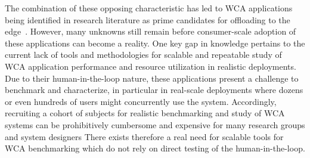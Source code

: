The combination of these opposing characteristic has led to \ac{WCA} applications being identified in research literature as prime candidates for offloading to the edge~\cite{Ha2014towards,Chen2017Empirical,Chen2018application}.
However, many unknowns still remain before consumer-scale adoption of these applications can become a reality.
One key gap in knowledge pertains to the current lack of tools and methodologies for scalable and repeatable study of \ac{WCA} application performance and resource utilization in realistic deployments.
Due to their human-in-the-loop nature, these applications present a challenge to benchmark and characterize, in particular in real-scale deployments where dozens or even hundreds of users might concurrently use the system.
Accordingly, recruiting a  cohort of subjects for realistic benchmarking and study of \ac{WCA} systems can be prohibitively cumbersome and expensive for many research groups and system designers
There exists therefore a real need for scalable tools for \ac{WCA} benchmarking which do not rely on direct testing of the human-in-the-loop.

\medskip

